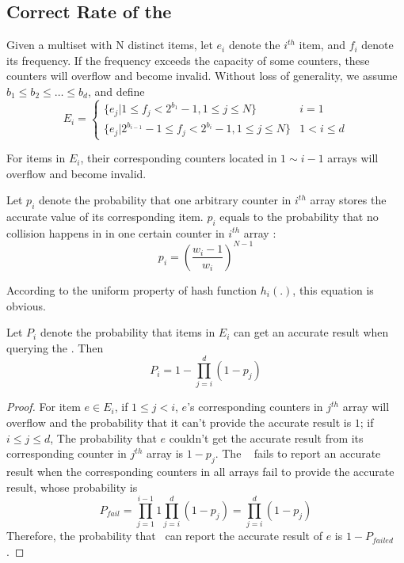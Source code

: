 \presub
\subsection{Correct Rate of the \ccm} \postsub

Given a multiset with N distinct items, let $e_i$ denote the $i^{th}$ item, and $f_i$ denote its frequency. If the frequency exceeds the capacity of some counters, these counters will overflow and become invalid. Without loss of generality, we assume $b_1 \le b_2 \le \dots \le b_d$, and define
\begin{equation*}
E_i=
\begin{cases}
\{e_j|1\le f_j < 2^{b_1}-1, 1\le j \le N \} & {i=1}\\
\{e_j|2^{b_{i-1}}-1\le f_j < 2^{b_i}-1, 1\le j \le N\} & {1 < i \le d}
\end{cases}
\end{equation*}

For items in $E_i$, their corresponding counters located in $1 \sim i-1$ arrays will overflow and become invalid.

\begin{thm}
Let $p_i$ denote the probability that one arbitrary counter in $i^{th}$ array stores the accurate value of its corresponding item. 
$p_i$ equals to the probability that no collision happens in in one certain counter in $i^{th}$ array :
\begin{equation}
p_i=(\frac{w_i-1}{w_i})^{N-1} 
\end{equation}

\end{thm}
According to the uniform property of hash function $h_i(.)$, this equation is obvious.

\begin{thm}
Let $P_i$ denote the probability that items in $E_i$ can get an accurate result when querying the \ccm. Then
\begin{equation}
P_i=1-\prod_{j=i}^{d}(1-p_j)
\end{equation}
\end{thm}

\begin{proof}
For item $e \in E_i$, if $1\le j<i$, $e$'s corresponding counters in $j^{th}$ array will overflow and the probability that it can't provide the accurate result is $1$; 
if $i\le j \le d$, The probability that $e$ couldn't get the accurate result from its corresponding counter in $j^{th}$ array is $1-p_j$. 
The \ccm~ fails to report an accurate result when the corresponding counters in all arrays fail to provide the accurate result, whose probability is 
$$  P_{fail}=\prod_{j=1}^{i-1}1 \prod_{j=i}^{d}(1-p_j)=\prod_{j=i}^{d}(1-p_j) $$
Therefore, the probability that \ccm~can report the accurate result of $e$ is $1-P_{failed}$.
\end{proof}

